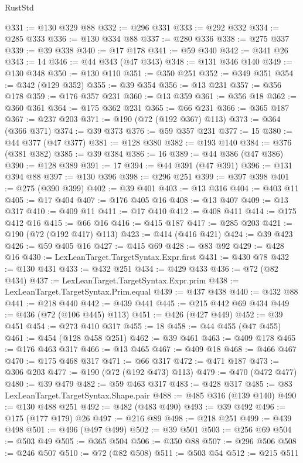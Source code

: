 \begin{lexlean}{RustStd}
\begin{coremodule}
@331 := @130 @329 @88
@332 := @296 @331
@333 := @292 @332
@334 := @285 @333
@336 := @130 @334 @88
@337 := @280 @336
@338 := @275 @337
@339 := @39 @338
@340 := @17 @178
@341 := @59 @340
@342 := @341 @26
@343 := 14
@346 := @44 @343 (@47 @343)
@348 := @131 @346 @140
@349 := @130 @348
@350 := @130 @110
@351 := @350 @251
@352 := @349 @351
@354 := @342 (@129 @352)
@355 := @39 @354
@356 := @13 @231
@357 := @356 @178
@359 := @176 @357 @231
@360 := @13 @359
@361 := @356 @18
@362 := @360 @361
@364 := @175 @362 @231
@365 := @66 @231
@366 := @365 @187
@367 := @237 @203
@371 := @190 (@72 (@192 @367) @113)
@373 := @364 (@366 @371)
@374 := @39 @373
@376 := @59 @357 @231
@377 := 15
@380 := @44 @377 (@47 @377)
@381 := @128 @380
@382 := @193 @140
@384 := @376 (@381 @382)
@385 := @39 @384
@386 := 16
@389 := @44 @386 (@47 @386)
@390 := @128 @389
@391 := 17
@394 := @44 @391 (@47 @391)
@396 := @131 @394 @88
@397 := @130 @396
@398 := @296 @251
@399 := @397 @398
@401 := @275 (@390 @399)
@402 := @39 @401
@403 := @13 @316
@404 := @403 @11
@405 := @17 @404
@407 := @176 @405 @16
@408 := @13 @407
@409 := @13 @317
@410 := @409 @11
@411 := @17 @410
@412 := @408 @411
@414 := @175 @412 @16
@415 := @66 @16
@416 := @415 @187
@417 := @285 @203
@421 := @190 (@72 (@192 @417) @113)
@423 := @414 (@416 @421)
@424 := @39 @423
@426 := @59 @405 @16
@427 := @415 @69
@428 := @83 @92
@429 := @428 @16
@430 := LexLeanTarget.TargetSyntax.Expr.first
@431 := @430 @78
@432 := @130 @431
@433 := @432 @251
@434 := @429 @433
@436 := @72 (@82 @434)
@437 := LexLeanTarget.TargetSyntax.Expr.prim
@438 := LexLeanTarget.TargetSyntax.Prim.equal
@439 := @437 @438
@440 := @432 @88
@441 := @218 @440
@442 := @439 @441
@445 := @215 @442 @69 @434
@449 := @436 (@72 (@106 @445) @113)
@451 := @426 (@427 @449)
@452 := @39 @451
@454 := @273 @410 @317
@455 := 18
@458 := @44 @455 (@47 @455)
@461 := @454 (@128 @458 @251)
@462 := @39 @461
@463 := @409 @178
@465 := @176 @463 @317
@466 := @13 @465
@467 := @409 @18
@468 := @466 @467
@470 := @175 @468 @317
@471 := @66 @317
@472 := @471 @187
@473 := @306 @203
@477 := @190 (@72 (@192 @473) @113)
@479 := @470 (@472 @477)
@480 := @39 @479
@482 := @59 @463 @317
@483 := @428 @317
@485 := @83 LexLeanTarget.TargetSyntax.Shape.pair
@488 := @485 @316 (@139 @140)
@490 := @130 @488 @251
@492 := @482 (@483 @490)
@493 := @39 @492
@496 := @175 (@177 @179) @26
@497 := @216 @89
@498 := @218 @251
@499 := @439 @498
@501 := @496 (@497 @499)
@502 := @39 @501
@503 := @256 @69
@504 := @503 @49
@505 := @365 @504
@506 := @350 @88
@507 := @296 @506
@508 := @246 @507
@510 := @72 (@82 @508)
@511 := @503 @54
@512 := @215 @511

\end{coremodule}
\end{lexlean}
